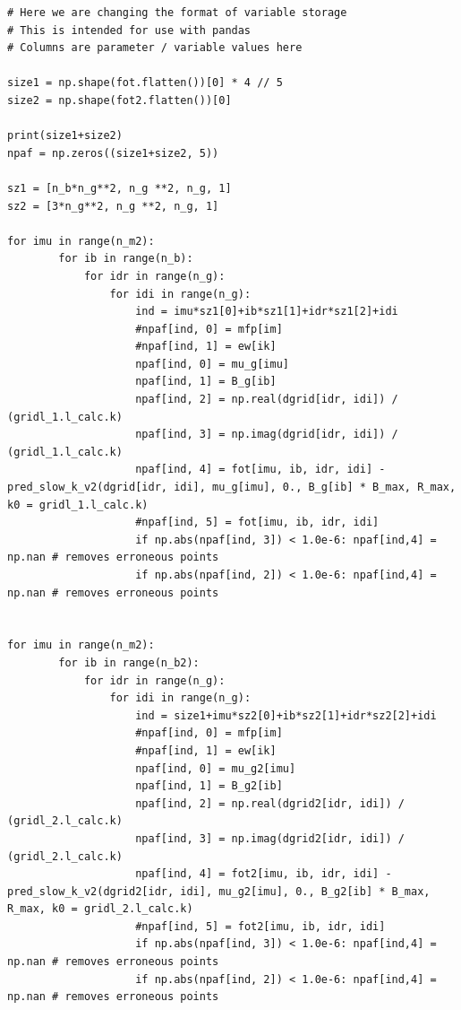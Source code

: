 \documentclass{article}
\begin{document}
\begin{lstlisting}
# Here we are changing the format of variable storage
# This is intended for use with pandas
# Columns are parameter / variable values here

size1 = np.shape(fot.flatten())[0] * 4 // 5
size2 = np.shape(fot2.flatten())[0]

print(size1+size2)
npaf = np.zeros((size1+size2, 5))

sz1 = [n_b*n_g**2, n_g **2, n_g, 1]
sz2 = [3*n_g**2, n_g **2, n_g, 1]

for imu in range(n_m2):
        for ib in range(n_b):
            for idr in range(n_g):
                for idi in range(n_g):
                    ind = imu*sz1[0]+ib*sz1[1]+idr*sz1[2]+idi
                    #npaf[ind, 0] = mfp[im]
                    #npaf[ind, 1] = ew[ik]
                    npaf[ind, 0] = mu_g[imu]
                    npaf[ind, 1] = B_g[ib]
                    npaf[ind, 2] = np.real(dgrid[idr, idi]) / (gridl_1.l_calc.k)
                    npaf[ind, 3] = np.imag(dgrid[idr, idi]) / (gridl_1.l_calc.k)
                    npaf[ind, 4] = fot[imu, ib, idr, idi] - pred_slow_k_v2(dgrid[idr, idi], mu_g[imu], 0., B_g[ib] * B_max, R_max, k0 = gridl_1.l_calc.k)
                    #npaf[ind, 5] = fot[imu, ib, idr, idi]
                    if np.abs(npaf[ind, 3]) < 1.0e-6: npaf[ind,4] = np.nan # removes erroneous points
                    if np.abs(npaf[ind, 2]) < 1.0e-6: npaf[ind,4] = np.nan # removes erroneous points


for imu in range(n_m2):
        for ib in range(n_b2):
            for idr in range(n_g):
                for idi in range(n_g):
                    ind = size1+imu*sz2[0]+ib*sz2[1]+idr*sz2[2]+idi
                    #npaf[ind, 0] = mfp[im]
                    #npaf[ind, 1] = ew[ik]
                    npaf[ind, 0] = mu_g2[imu]
                    npaf[ind, 1] = B_g2[ib]
                    npaf[ind, 2] = np.real(dgrid2[idr, idi]) / (gridl_2.l_calc.k)
                    npaf[ind, 3] = np.imag(dgrid2[idr, idi]) / (gridl_2.l_calc.k)
                    npaf[ind, 4] = fot2[imu, ib, idr, idi] - pred_slow_k_v2(dgrid2[idr, idi], mu_g2[imu], 0., B_g2[ib] * B_max, R_max, k0 = gridl_2.l_calc.k)
                    #npaf[ind, 5] = fot2[imu, ib, idr, idi]
                    if np.abs(npaf[ind, 3]) < 1.0e-6: npaf[ind,4] = np.nan # removes erroneous points
                    if np.abs(npaf[ind, 2]) < 1.0e-6: npaf[ind,4] = np.nan # removes erroneous points\end{lstlisting}
\end{document}
